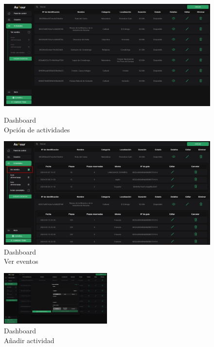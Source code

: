\begin{figure}[H]
	\centering
	\begin{minipage}{0.45\textwidth}
		\centering
		\includegraphics[width=1\textwidth]{7-Construccion/Manuales/web/actividades opcion.png}
		\caption{Dashboard \\ Opción de actividades}
		\label{fig:actividades-opcion}
	\end{minipage}
	\hfill
	\begin{minipage}{0.45\textwidth}
		\centering
		\includegraphics[width=1\textwidth]{7-Construccion/Manuales/web/actividades ver eventos.png}
		\caption{Dashboard \\ Ver eventos}
		\label{fig:actividades-ver-eventos}
	\end{minipage}
\end{figure}

\begin{figure}[H]
	\centering
	\includegraphics[width=0.5\textwidth]{7-Construccion/Manuales/web/actividad add.png}
	\caption{Dashboard \\ Añadir actividad}
	\label{fig:actividades-add}
\end{figure}

